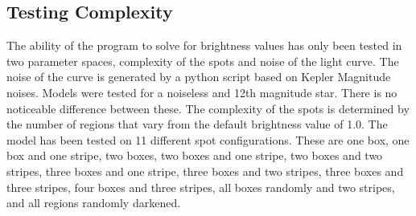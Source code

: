 

\subsection{Testing Complexity \label{complexity}}
The ability of the program to solve for brightness values has only been tested in two parameter spaces, complexity of the spots and noise of the light curve. The noise of the curve is generated by a python script based on Kepler Magnitude noises. Models were tested for a noiseless and 12th magnitude star. There is no noticeable difference between these.
The complexity of the spots is determined by the number of regions that vary from the default brightness value of 1.0. The model has been tested on 11 different spot configurations. These are one box, one box and one stripe, two boxes, two boxes and one stripe, two boxes and two stripes, three boxes and one stripe, three boxes and two stripes, three boxes and three stripes, four boxes and three stripes, all boxes randomly and two stripes, and all regions randomly darkened.

